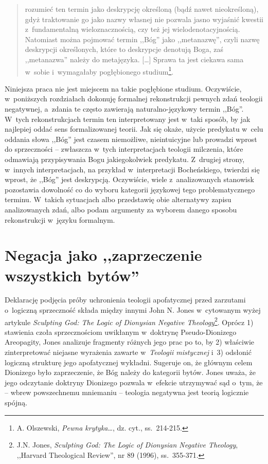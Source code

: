 \begin{quote}
rozumieć ten termin jako deskrypcję określoną (bądź nawet nieokreśloną), gdyż traktowanie go jako nazwy własnej nie pozwala jasno wyjaśnić kwestii z~fundamentalną wieloznacznością, czy też jej wielodenotacyjnością. Natomiast można pojmować termin ,,Bóg'' jako ,,metanazwę'', czyli nazwę deskrypcji określonych, które to deskrypcje denotują Boga, zaś ,,metanazwa'' należy do metajęzyka. [\ldots] Sprawa ta jest ciekawa sama w~sobie i~wymagałaby pogłębionego studium\footnote{A. Olszewski, \textit{Pewna krytyka}\ldots, dz. cyt., ss.~214-215.}.
\end{quote}

Niniejsza praca nie jest miejscem na takie pogłębione studium. Oczywiście, w~poniższych rozdziałach dokonuję formalnej rekonstrukcji pewnych zdań teologii negatywnej, a~zdania te często zawierają naturalno-językowy termin ,,Bóg''. W~tych rekonstrukcjach termin ten interpretowany jest w~taki sposób, by jak najlepiej oddać sens formalizowanej teorii. Jak się okaże, użycie predykatu w~celu oddania słowa ,,Bóg'' jest czasem niemożliwe, nieintuicyjne lub prowadzi wprost do sprzeczności – zwłaszcza w~tych interpretacjach teologii milczenia, które odmawiają przypisywania Bogu jakiegokolwiek predykatu. Z~drugiej strony, w~innych interpretacjach, na przykład w~interpretacji Bocheńskiego, twierdzi się wprost, że ,,Bóg'' jest deskrypcją. Oczywiście, wiele z~analizowanych stanowisk pozostawia dowolność co do wyboru kategorii językowej tego problematycznego terminu. W~takich sytuacjach albo przedstawię obie alternatywy zapisu analizowanych zdań, albo podam argumenty za wyborem danego sposobu rekonstrukcji w~języku formalnym.


\chapter{Negacja jako ,,zaprzeczenie wszystkich bytów''}\label{sil-jones}

Deklarację podjęcia próby uchronienia teologii apofatycznej przed zarzutami o~logiczną sprzeczność składa między innymi John N. Jones w~cytowanym wyżej artykule \textit{Sculpting God: The Logic of Dionysian Negative Theology}\footnote{J.N. Jones, \textit{Sculpting God: The Logic of Dionysian Negative Theology}, ,,Harvard Theological Review'', nr 89 (1996), ss.~355-371.}. Oprócz 1) stawienia czoła sprzecznościom uwikłanym w~doktrynę Pseudo-Dionizego Areopagity, Jones analizuje fragmenty różnych jego prac po to, by 2) właściwie zinterpretować niejasne wyrażenia zawarte w~\textit{Teologii mistycznej} i~3) odsłonić logiczną strukturę jego apofatycznej wykładni. Sugeruje on, że głównym celem Dionizego było zaprzeczenie, że Bóg należy do kategorii bytów. Jones uważa, że jego odczytanie doktryny Dionizego pozwala w~efekcie utrzymywać sąd o~tym, że -- wbrew powszechnemu mniemaniu -- teologia negatywna jest teorią logicznie spójną.

